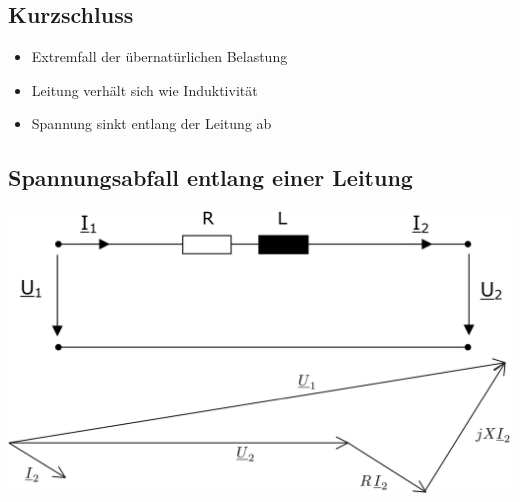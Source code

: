 \vspace{0.15cm}


\subsection{Kurzschluss}

\begin{itemize}
    \item Extremfall der übernatürlichen Belastung
    \item Leitung verhält sich wie Induktivität
    \item Spannung sinkt entlang der Leitung ab
\end{itemize}


\subsection{Spannungsabfall entlang einer Leitung}

\includegraphics[width=0.75\columnwidth, align=c]{images/Spannungsabfall_entlang_einer_Leitung.png}

\vspace{0.15cm}






























